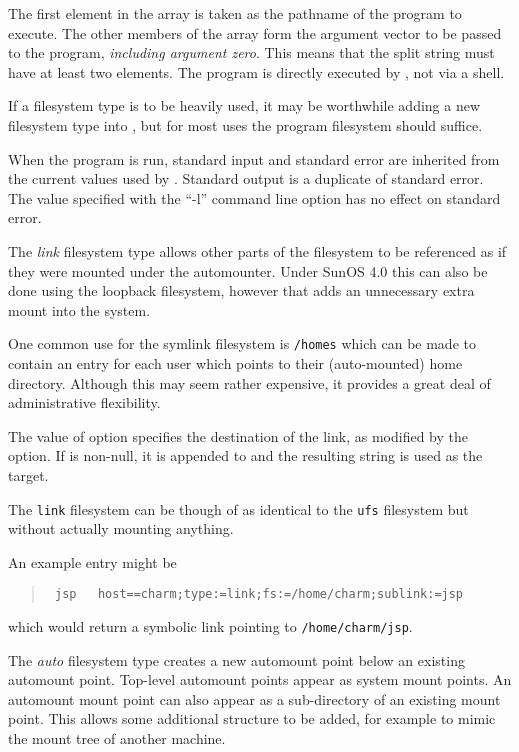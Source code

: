 The first element in the array is taken as the pathname of the program
to execute.  The other members of the array form the argument vector
to be passed to the program, {\em including argument zero}.  This means
that the split string must have at least two elements.
The program is directly executed by \amd, not via a shell.

If a filesystem type is to be heavily used, it may be worthwhile
adding a new filesystem type into \amd, but for most uses the
program filesystem should suffice.

When the program is run, standard input and standard error are inherited
from the current values used by \amd.  Standard output is a duplicate of
standard error.  The value specified with the ``-l'' command line option
has no effect on standard error.


The {\em link} filesystem type allows other parts of the filesystem
to be referenced as if they were mounted under the automounter.
Under SunOS 4.0 this can also be done using the loopback filesystem,
however that adds an unnecessary extra mount into the system.

One common use for the symlink filesystem is {\tt /homes}
which can be made to contain an entry for each user which points
to their (auto-mounted) home directory.  Although this may seem
rather expensive, it provides a great deal of administrative
flexibility.

The value of  option specifies the destination of the link, as modified
by the  option.  If  is non-null, it
is appended to  and the resulting string is used as the target.

The {\tt link} filesystem can be though of as identical to the {\tt ufs} filesystem
but without actually mounting anything.

An example entry might be
\begin{quote}
\tt
jsp\ \ \ host==charm;type:=link;fs:=/home/charm;sublink:=jsp
\end{quote}
which would return a symbolic link pointing to {\tt /home/charm/jsp}.

\label{auto-fs}

The {\em auto} filesystem type creates a new automount point
below an existing automount point.
Top-level automount points appear as system mount points.
An automount mount point can also appear as a sub-directory of an existing mount point.
This allows some additional structure to be added,
for example to mimic the mount tree of another
machine.%

